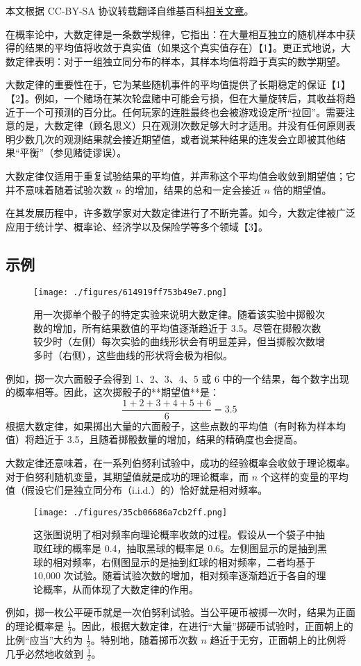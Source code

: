 
本文根据 CC-BY-SA 协议转载翻译自维基百科\href{https://en.wikipedia.org/wiki/Law_of_large_numbers}{相关文章}。

在概率论中，大数定律是一条数学规律，它指出：在大量相互独立的随机样本中获得的结果的平均值将收敛于真实值（如果这个真实值存在）【1】。更正式地说，大数定律表明：对于一组独立同分布的样本，其样本均值将趋于真实的数学期望。

大数定律的重要性在于，它为某些随机事件的平均值提供了长期稳定的保证【1】【2】。例如，一个赌场在某次轮盘赌中可能会亏损，但在大量旋转后，其收益将趋近于一个可预测的百分比。任何玩家的连胜最终也会被游戏设定所“拉回”。需要注意的是，大数定律（顾名思义）只在观测次数足够大时才适用。并没有任何原则表明少数几次的观测结果就会接近期望值，或者说某种结果的连发会立即被其他结果“平衡”（参见赌徒谬误）。

大数定律仅适用于重复试验结果的平均值，并声称这个平均值会收敛到期望值；它并不意味着随着试验次数 $n$ 的增加，结果的总和一定会接近 $n$ 倍的期望值。

在其发展历程中，许多数学家对大数定律进行了不断完善。如今，大数定律被广泛应用于统计学、概率论、经济学以及保险学等多个领域【3】。
\subsection{示例}
\begin{figure}[ht]
\centering
\texttt{[image: ./figures/614919ff753b49e7.png]}
\caption{用一次掷单个骰子的特定实验来说明大数定律。随着该实验中掷骰次数的增加，所有结果数值的平均值逐渐趋近于 3.5。尽管在掷骰次数较少时（左侧）每次实验的曲线形状会有明显差异，但当掷骰次数增多时（右侧），这些曲线的形状将会极为相似。} \label{fig_DSdl_1}
\end{figure}
例如，掷一次六面骰子会得到 1、2、3、4、5 或 6 中的一个结果，每个数字出现的概率相等。因此，这次掷骰子的**期望值**是：
$$
\frac{1 + 2 + 3 + 4 + 5 + 6}{6} = 3.5~
$$
根据大数定律，如果掷出大量的六面骰子，这些点数的平均值（有时称为样本均值）将趋近于 3.5，且随着掷骰数量的增加，结果的精确度也会提高。

大数定律还意味着，在一系列伯努利试验中，成功的经验概率会收敛于理论概率。对于伯努利随机变量，其期望值就是成功的理论概率，而 $n$ 个这样的变量的平均值（假设它们是独立同分布（i.i.d.）的）恰好就是相对频率。
\begin{figure}[ht]
\centering
\texttt{[image: ./figures/35cb06686a7cb2ff.png]}
\caption{这张图说明了相对频率向理论概率收敛的过程。假设从一个袋子中抽取红球的概率是 0.4，抽取黑球的概率是 0.6。左侧图显示的是抽到黑球的相对频率，右侧图显示的是抽到红球的相对频率，二者均基于 10,000 次试验。随着试验次数的增加，相对频率逐渐趋近于各自的理论概率，从而体现了大数定律的作用。} \label{fig_DSdl_2}
\end{figure}
例如，掷一枚公平硬币就是一次伯努利试验。当公平硬币被掷一次时，结果为正面的理论概率是 $\frac{1}{2}$。因此，根据大数定律，在进行“大量”掷硬币试验时，正面朝上的比例“应当”大约为 $\frac{1}{2}$。特别地，随着掷币次数 $n$ 趋近于无穷，正面朝上的比例将几乎必然地收敛到 $\frac{1}{2}$。

